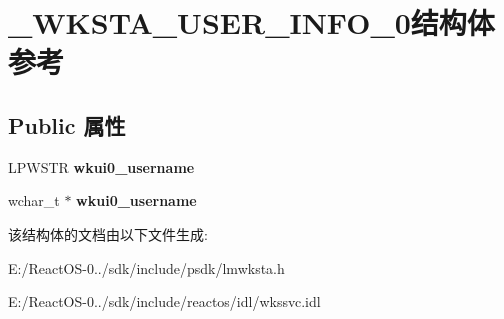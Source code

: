\hypertarget{struct___w_k_s_t_a___u_s_e_r___i_n_f_o__0}{}\section{\+\_\+\+W\+K\+S\+T\+A\+\_\+\+U\+S\+E\+R\+\_\+\+I\+N\+F\+O\+\_\+0结构体 参考}
\label{struct___w_k_s_t_a___u_s_e_r___i_n_f_o__0}
\subsection*{Public 属性}
\begin{DoxyCompactItemize}
\item 
\mbox{\label{struct___w_k_s_t_a___u_s_e_r___i_n_f_o__0_a08833462481a4f5b7453d148994d74be}} 
L\+P\+W\+S\+TR {\bfseries wkui0\+\_\+username}
\item 
\mbox{\label{struct___w_k_s_t_a___u_s_e_r___i_n_f_o__0_aa0ec295e6af284b3845d1357b08d7d69}} 
wchar\+\_\+t $\ast$ {\bfseries wkui0\+\_\+username}
\end{DoxyCompactItemize}


该结构体的文档由以下文件生成\+:\begin{DoxyCompactItemize}
\item 
E\+:/\+React\+O\+S-\/0../sdk/include/psdk/lmwksta.\+h\item 
E\+:/\+React\+O\+S-\/0../sdk/include/reactos/idl/wkssvc.\+idl\end{DoxyCompactItemize}
